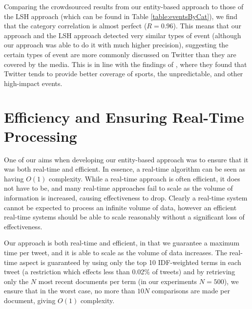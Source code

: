 Comparing the crowdsourced results from our entity-based approach to those of the LSH approach (which can be found in Table \ref{table:eventsByCat}), we find that the category correlation is almost perfect ($R = 0.96$).
This means that our approach and the LSH approach detected very similar types of event (although our approach was able to do it with much higher precision), suggesting the certain types of event are more commonly discussed on Twitter than they are covered by the media.
This is in line with the findings of \cite{ICWSM136066}, where they found that Twitter tends to provide better coverage of sports, the unpredictable, and other high-impact events.


\section{Efficiency and Ensuring Real-Time Processing}
One of our aims when developing our entity-based approach was to ensure that it was both real-time and efficient. In essence, a real-time algorithm can be seen as having \(O(1)\) complexity. While a real-time approach is often efficient, it does not have to be, and many real-time approaches fail to scale as the volume of information is increased, causing effectiveness to drop. Clearly a real-time system cannot be expected to process an infinite volume of data, however an efficient real-time systems should be able to scale reasonably without a significant loss of effectiveness.

Our approach is both real-time and efficient, in that we guarantee a maximum time per tweet, and it is able to scale as the volume of data increases.
The real-time aspect is guaranteed by using only the top 10 IDF-weighted terms in each tweet (a restriction which effects less than 0.02\% of tweets) and by retrieving only the \(N\) most recent documents per term (in our experiments \(N = 500\)), we ensure that in the worst case, no more than \(10N\) comparisons are made per document, giving \(O(1)\) complexity.


